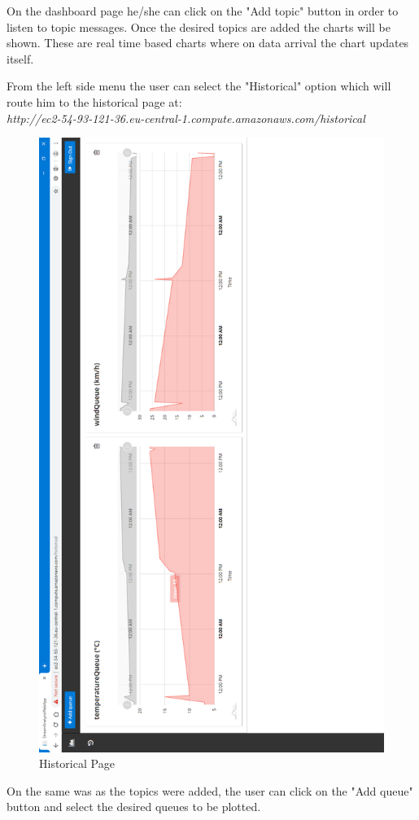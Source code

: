 On the dashboard page he/she can click on the "Add topic" button in order to listen to topic messages. Once the desired topics are added the charts will be shown. These are real time based charts where on data arrival the chart updates itself.

From the left side menu the user can select the "Historical" option which will route him to the historical page at:\\

\textit{http://ec2-54-93-121-36.eu-central-1.compute.amazonaws.com/historical}\\

\begin{figure}[p]
	\centering
	\noindent
	\includegraphics[width=0.5\paperwidth]{./images/guide/dashboard/historical.PNG}
	\caption{Historical Page}
	\label{fig:historical}
\end{figure}

On the same was as the topics were added, the user can click on the "Add queue" button and select the desired queues to be plotted.
